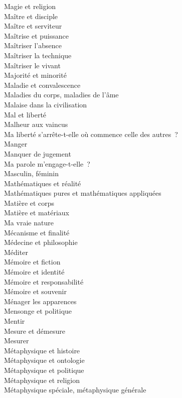 \documentclass[a4paper,12pt]{article}
\begin{document}
Magie et religion \\
Maître et disciple \\
Maître et serviteur \\
Maîtrise et puissance \\
Maîtriser l'absence \\
Maîtriser la technique \\
Maîtriser le vivant \\
Majorité et minorité \\
Maladie et convalescence \\
Maladies du corps, maladies de l'âme \\
Malaise dans la civilisation \\
Mal et liberté \\
Malheur aux vaincus \\
Ma liberté s'arrête-t-elle où commence celle des autres ? \\
Manger \\
Manquer de jugement \\
Ma parole m'engage-t-elle ? \\
Masculin, féminin \\
Mathématiques et réalité \\
Mathématiques pures et mathématiques appliquées \\
Matière et corps \\
Matière et matériaux \\
Ma vraie nature \\
Mécanisme et finalité \\
Médecine et philosophie \\
Méditer \\
Mémoire et fiction \\
Mémoire et identité \\
Mémoire et responsabilité \\
Mémoire et souvenir \\
Ménager les apparences \\
Mensonge et politique \\
Mentir \\
Mesure et démesure \\
Mesurer \\
Métaphysique et histoire \\
Métaphysique et ontologie \\
Métaphysique et politique \\
Métaphysique et religion \\
Métaphysique spéciale, métaphysique générale \\
\end{document}
